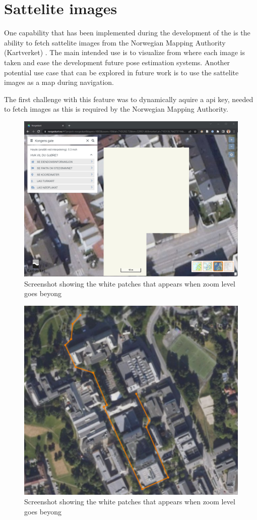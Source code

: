 \section{Sattelite images}
One capability that has been implemented during the development of the \gui is the ability to fetch sattelite images from the Norwegian Mapping Authority (Kartverket) \cite{kartverketNorgeskart}.
The main intended use is to visualize from where each image is taken and ease the development future pose estimation systems.
Another potential use case that can be explored in future work is to use the sattelite images as a map during navigation.

The first challenge with this feature was to dynamically aquire a api key, needed to fetch images as this is required by the Norwegian Mapping Authority.


\begin{figure}[H]
    \centering
    \includegraphics[width=.6\textwidth]{figures/gui/norgeskart_bug.png}
    \caption{Screenshot showing the white patches that appears when zoom level goes beyong \todo \cite{kartverketNorgeskart}}
    \label{fig:norgeskart_bug}
\end{figure}
\begin{figure}[H]
    \centering
    \includegraphics[width=.6\textwidth]{figures/gui/sattelite_with_plot.png}
    \caption{Screenshot showing the white patches that appears when zoom level goes beyong \todo \cite{kartverketNorgeskart}}
    \label{fig:norgeskart_bug}
\end{figure}